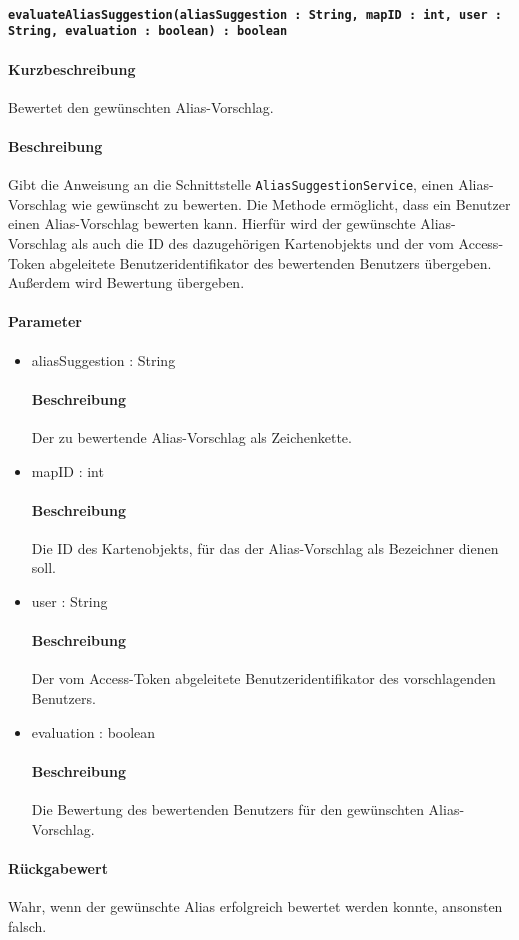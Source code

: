 \paragraph*{\texttt{evaluateAliasSuggestion(aliasSuggestion : String, mapID : int, user : String, evaluation : boolean) : boolean}}%
\paragraph*{Kurzbeschreibung}
Bewertet den gewünschten Alias-Vorschlag.
\paragraph*{Beschreibung}
Gibt die Anweisung an die Schnittstelle \texttt{AliasSuggestionService}, einen Alias-Vorschlag wie gewünscht zu bewerten.
Die Methode ermöglicht, dass ein Benutzer einen Alias-Vorschlag bewerten kann. 
Hierfür wird der gewünschte Alias-Vorschlag als auch die ID des dazugehörigen Kartenobjekts und der vom Access-Token abgeleitete Benutzeridentifikator des bewertenden Benutzers übergeben.
Außerdem wird Bewertung übergeben.
\paragraph*{Parameter}
\begin{itemize}
	\item aliasSuggestion : String
		\paragraph*{Beschreibung}
		Der zu bewertende Alias-Vorschlag als Zeichenkette.
	\item mapID : int
		\paragraph*{Beschreibung}
		Die ID des Kartenobjekts, für das der Alias-Vorschlag als Bezeichner dienen soll.
	\item user : String
		\paragraph*{Beschreibung}
		Der vom Access-Token abgeleitete Benutzeridentifikator des vorschlagenden Benutzers.
	\item evaluation : boolean
		\paragraph*{Beschreibung}
		Die Bewertung des bewertenden Benutzers für den gewünschten Alias-Vorschlag.
\end{itemize}
\paragraph*{Rückgabewert}
Wahr, wenn der gewünschte Alias erfolgreich bewertet werden konnte, ansonsten falsch.
